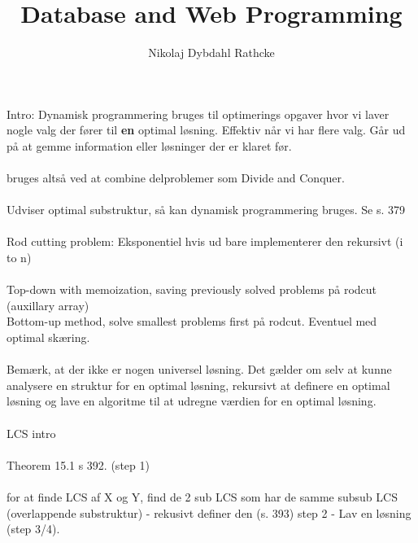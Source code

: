 \documentclass[12pt]{article}
\title{Database and Web Programming}
\author{Nikolaj Dybdahl Rathcke}
\begin{document}
Intro: Dynamisk programmering bruges til optimerings opgaver hvor vi laver nogle valg der fører til \textbf{en} optimal løsning. Effektiv når vi har flere valg. Går ud på at gemme information eller løsninger der er klaret før.\\
\\
bruges altså ved at combine delproblemer som Divide and Conquer.\\
\\
Udviser optimal substruktur, så kan dynamisk programmering bruges. Se s. 379\\
\\
Rod cutting problem: Eksponentiel hvis ud bare implementerer den rekursivt (i to n)
\\
\\
Top-down with memoization, saving previously solved problems på rodcut (auxillary array)\\
Bottom-up method, solve smallest problems first på rodcut. Eventuel med optimal skæring.\\
\\
Bemærk, at der ikke er nogen universel løsning. Det gælder om selv at kunne analysere en struktur for en optimal løsning, rekursivt at definere en optimal løsning og lave en algoritme til at udregne værdien for en optimal løsning.\\
\\
LCS intro\\
\\
Theorem 15.1 s 392. (step 1)\\
\\
for at finde LCS af X og Y, find de 2 sub LCS som har de samme subsub LCS (overlappende substruktur) - rekusivt definer den (s. 393) step 2 - Lav en løsning (step 3/4).
\end{document}
